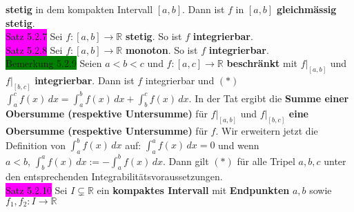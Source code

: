 \documentclass[landscape, 10pt]{article}
\newcommand{\R}{\mathbb{R}}
\begin{document}
\begin{multicols}{3}
                     \textbf{stetig} in dem kompakten Intervall 
                     \textcolor{NavyBlue}{$[a,b]$}. 
                     Dann ist \textcolor{NavyBlue}{$f$} in 
                     \textcolor{NavyBlue}{$[a,b]$}
                     \textbf{gleichmässig stetig}.\\
              \colorbox{magenta}{Satz 5.2.7} 
                     Sei \textcolor{NavyBlue}{$f:[a,b]\longrightarrow\R$} 
                     \textbf{stetig}. So ist \textcolor{NavyBlue}{$f$} 
                     \textbf{integrierbar}.\\
              \colorbox{magenta}{Satz 5.2.8} 
                     Sei \textcolor{NavyBlue}{$f:[a,b]\longrightarrow\R$} 
                     \textbf{monoton}. So ist \textcolor{NavyBlue}{$f$} 
                     \textbf{integrierbar}.\\
              \colorbox{green}{Bemerkung 5.2.9} 
                     Seien \textcolor{NavyBlue}{$a<b<c$} und 
                     \textcolor{NavyBlue}{$f:[a,c]\longrightarrow\R$} 
                     \textbf{beschränkt} mit 
                     \textcolor{NavyBlue}{$f|_{[a,b]}$} und 
                     \textcolor{NavyBlue}{$f|_{[b,c]}$} 
                     \textbf{integrierbar}. Dann ist 
                     \textcolor{NavyBlue}{$f$} integrierbar und $(*)$ 
                     \textcolor{NavyBlue}{
                     $\int_a^cf(x)\,dx=\int_a^bf(x)\,dx+\int_b^cf(x)\,dx$}.
                     In der Tat ergibt die \textbf{Summe einer Obersumme 
                     (respektive Untersumme)} für 
                     \textcolor{NavyBlue}{$f|_{[a,b]}$} und 
                     \textcolor{NavyBlue}{$f|_{[b,c]}$} 
                     \textbf{eine Obersumme (respektive Untersumme)} für 
                     \textcolor{NavyBlue}{$f$}. Wir
                     erweitern jetzt die Definition von 
                     \textcolor{NavyBlue}{$\int_a^bf(x)\,dx$} auf: 
                     \textcolor{NavyBlue}{$\int_a^af(x)\,dx=0$} und wenn 
                     \textcolor{NavyBlue}{$a<b,\,\int_b^af(x)\,dx:=-\int_a^bf(x)\,dx$}.
                     Dann gilt $(*)$ für alle Tripel \textcolor{NavyBlue}{$a,b,c$} 
                     unter den entsprechenden Integrabilitätsvoraussetzungen. \\
              \colorbox{magenta}{Satz 5.2.10}
                     Sei \textcolor{NavyBlue}{$I\subsetneq\R$} 
                     ein \textbf{kompaktes Intervall} 
                     mit \textbf{Endpunkten} \textcolor{NavyBlue}{$a,b$} sowie 
                     \textcolor{NavyBlue}{$f_1,f_2:I\longrightarrow\R$}

\end{multicols}
\end{document}
